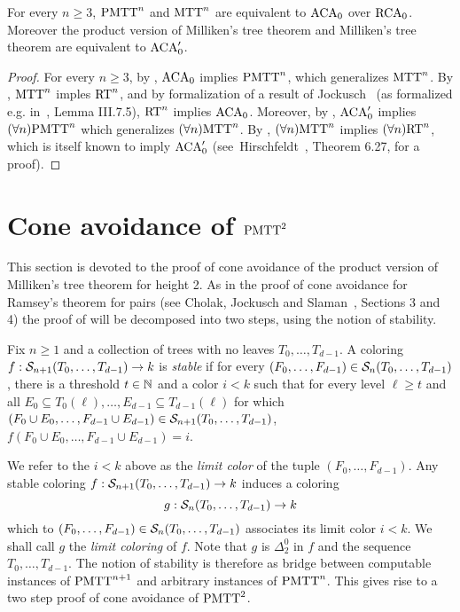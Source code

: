 \begin{corollary}
  For every $n\geq 3$, $\mathrm{PMTT}^{n}_{}$ and $\mathrm{MTT}^{n}_{}$ are equivalent to $\mathrm{ACA}_0$ over
  $\mathrm{RCA}_0$. Moreover the product version of Milliken's tree theorem and Milliken's tree theorem are equivalent to $\mathrm{ACA}'_0$.
\end{corollary}
\begin{proof}
For every $n \geq 3$, by , $\mathrm{ACA}_0$ implies $\mathrm{PMTT}^{n}_{}$,
which generalizes $\mathrm{MTT}^{n}_{}$. By , $\mathrm{MTT}^{n}_{}$ imples $\mathrm{RT}^{n}_{}$,
and by formalization of a result of Jockusch~\cite[Theorem 5.7]{Jockusch1972Ramseys} (as formalized e.g. in~\cite{Simpson2009Subsystems}, Lemma III.7.5), $\mathrm{RT}^{n}_{}$ implies $\mathrm{ACA}_0$.
Moreover, by , $\mathrm{ACA}'_0$ implies $(\forall n)\mathrm{PMTT}^{n}_{}$
which generalizes $(\forall n)\mathrm{MTT}^{n}_{}$. By , $(\forall n)\mathrm{MTT}^{n}_{}$ implies $(\forall n)\mathrm{RT}^{n}_{}$,
which is itself known to imply $\mathrm{ACA}'_0$ (see~Hirschfeldt~\cite{Hirschfeldt2015Slicing}, Theorem 6.27, for a proof).
\end{proof}


\section{Cone avoidance of $\mathrm{PMTT}^{2}_{}$}\label{subsect:cone-avoidance-pmt2}

This section is devoted to the proof of cone avoidance of the product version of Milliken's tree theorem for height 2. As in the proof of cone avoidance for Ramsey's theorem for pairs (see Cholak, Jockusch and Slaman~\cite{Cholak2001strength}, Sections 3 and 4) the proof of  will be decomposed into two steps, using the notion of stability.

\begin{definition}
Fix $n \geq 1$ and a collection of trees with no leaves $T_0, \dots, T_{d-1}$. A coloring $f: \mathcal{S}_{n+1}({T_0, \dots, T_{d-1}}) \to k$ is \emph{stable} if
for every $( F_0, \dots, F_{d-1} ) \in \mathcal{S}_{n}({T_0, \dots, T_{d-1}})$, there is a threshold $t \in \mathbb{N}$ and a color $i < k$ such that for every level $\ell \geq t$ and all $E_0 \subseteq T_0(\ell), \dots, E_{d-1} \subseteq T_{d-1}(\ell)$
for which $( F_0 \cup E_0, \dots, F_{d-1} \cup E_{d-1} ) \in \mathcal{S}_{n+1}({T_0, \dots, T_{d-1}})$, $f( F_0 \cup E_0, \dots, F_{d-1} \cup E_{d-1} ) = i$.
\end{definition}

We refer to the $i < k$ above as the \emph{limit color} of the tuple $( F_0, \dots, F_{d-1} )$. Any stable coloring $f: \mathcal{S}_{n+1}({T_0, \dots, T_{d-1}}) \to k$ induce{s}
a coloring 
$$
g: \mathcal{S}_{n}({T_0, \dots, T_{d-1}}) \to k
$$
which to $( F_0, \dots, F_{d-1} ) \in \mathcal{S}_{n}({T_0, \dots, T_{d-1}})$ associates its limit color $i < k$.
We shall call $g$ the \emph{limit coloring} of $f$. Note that $g$ is $\Delta^0_2$ in $f$ and the sequence $T_0, \dots, T_{d-1}$. The notion of stability is therefore as bridge between computable instances of $\mathrm{PMTT}^{n+1}_{}$ and arbitrary instances of $\mathrm{PMTT}^{n}_{}$. This gives rise to a two step proof of cone avoidance of $\mathrm{PMTT}^{2}_{}$.

